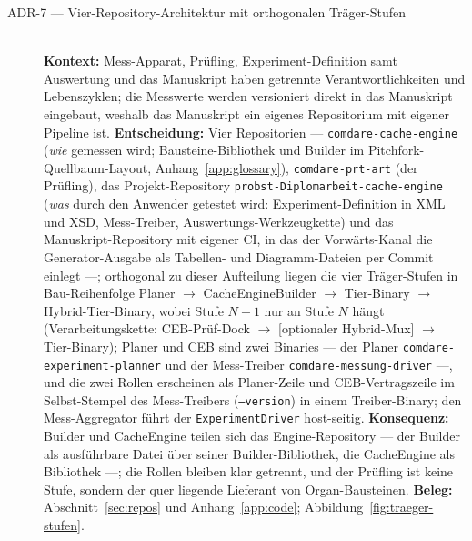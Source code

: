 \begin{description}
  \item[ADR-7 --- Vier-Repository-Architektur mit orthogonalen Träger-Stufen]\hfill\\
  \textbf{Kontext:} Mess-Apparat, Prüfling, Experiment-Definition samt Auswertung und das Manuskript
  haben getrennte Verantwortlichkeiten und Lebenszyklen; die Messwerte werden versioniert direkt in das
  Manuskript eingebaut, weshalb das Manuskript ein eigenes Repositorium mit eigener Pipeline ist.
  \textbf{Entscheidung:} Vier Repositorien --- \texttt{comdare-cache-engine} (\emph{wie} gemessen
  wird; Bausteine-Bibliothek und Builder im Pitchfork-Quellbaum-Layout, Anhang~\ref{app:glossary}),
  \texttt{comdare-prt-art} (der Prüfling), das Projekt-Repository
  \texttt{probst-Diplomarbeit-cache-engine} (\emph{was} durch den Anwender getestet wird:
  Experiment-Definition in XML und XSD, Mess-Treiber, Auswertungs-Werkzeugkette) und das
  Manuskript-Repository mit eigener CI, in das der Vorwärts-Kanal die Generator-Ausgabe als Tabellen-
  und Diagramm-Dateien per Commit einlegt ---; orthogonal zu dieser Aufteilung liegen die vier
  Träger-Stufen in Bau-Reihenfolge Planer $\to$ CacheEngineBuilder $\to$ Tier-Binary $\to$
  Hybrid-Tier-Binary, wobei Stufe $N+1$ nur an Stufe $N$ hängt (Verarbeitungskette: CEB-Prüf-Dock $\to$
  [optionaler Hybrid-Mux] $\to$ Tier-Binary); Planer und CEB sind zwei Binaries --- der Planer
  \texttt{comdare-experiment-planner} und der Mess-Treiber \texttt{comdare-messung-driver} ---, und
  die zwei Rollen erscheinen als Planer-Zeile und CEB-Vertragszeile im Selbst-Stempel des
  Mess-Treibers (\texttt{--version}) in einem Treiber-Binary; den
  Mess-Aggregator führt der \texttt{ExperimentDriver} host-seitig.
  \textbf{Konsequenz:} Builder und CacheEngine teilen sich das Engine-Repository --- der Builder als
  ausführbare Datei über seiner Builder-Bibliothek, die CacheEngine als Bibliothek ---; die Rollen
  bleiben klar getrennt, und der Prüfling ist keine Stufe, sondern der quer liegende Lieferant von
  Organ-Bausteinen.
  \textbf{Beleg:} Abschnitt~\ref{sec:repos} und Anhang~\ref{app:code};
  Abbildung~\ref{fig:traeger-stufen}.


\end{description}
